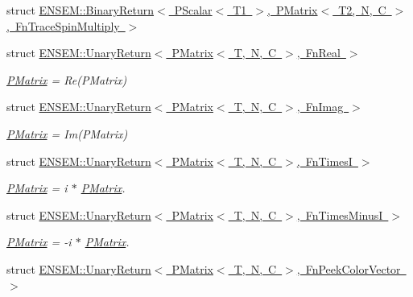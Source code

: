 \begin{DoxyCompactItemize}
\item 
struct \mbox{\hyperlink{structENSEM_1_1BinaryReturn_3_01PScalar_3_01T1_01_4_00_01PMatrix_3_01T2_00_01N_00_01C_01_4_00_01FnTraceSpinMultiply_01_4}{E\+N\+S\+E\+M\+::\+Binary\+Return$<$ P\+Scalar$<$ T1 $>$, P\+Matrix$<$ T2, N, C $>$, Fn\+Trace\+Spin\+Multiply $>$}}
\item 
struct \mbox{\hyperlink{structENSEM_1_1UnaryReturn_3_01PMatrix_3_01T_00_01N_00_01C_01_4_00_01FnReal_01_4}{E\+N\+S\+E\+M\+::\+Unary\+Return$<$ P\+Matrix$<$ T, N, C $>$, Fn\+Real $>$}}
\begin{DoxyCompactList}\small\item\em \mbox{\hyperlink{classENSEM_1_1PMatrix}{P\+Matrix}} = Re(\+P\+Matrix) \end{DoxyCompactList}\item 
struct \mbox{\hyperlink{structENSEM_1_1UnaryReturn_3_01PMatrix_3_01T_00_01N_00_01C_01_4_00_01FnImag_01_4}{E\+N\+S\+E\+M\+::\+Unary\+Return$<$ P\+Matrix$<$ T, N, C $>$, Fn\+Imag $>$}}
\begin{DoxyCompactList}\small\item\em \mbox{\hyperlink{classENSEM_1_1PMatrix}{P\+Matrix}} = Im(\+P\+Matrix) \end{DoxyCompactList}\item 
struct \mbox{\hyperlink{structENSEM_1_1UnaryReturn_3_01PMatrix_3_01T_00_01N_00_01C_01_4_00_01FnTimesI_01_4}{E\+N\+S\+E\+M\+::\+Unary\+Return$<$ P\+Matrix$<$ T, N, C $>$, Fn\+Times\+I $>$}}
\begin{DoxyCompactList}\small\item\em \mbox{\hyperlink{classENSEM_1_1PMatrix}{P\+Matrix}} = i $\ast$ \mbox{\hyperlink{classENSEM_1_1PMatrix}{P\+Matrix}}. \end{DoxyCompactList}\item 
struct \mbox{\hyperlink{structENSEM_1_1UnaryReturn_3_01PMatrix_3_01T_00_01N_00_01C_01_4_00_01FnTimesMinusI_01_4}{E\+N\+S\+E\+M\+::\+Unary\+Return$<$ P\+Matrix$<$ T, N, C $>$, Fn\+Times\+Minus\+I $>$}}
\begin{DoxyCompactList}\small\item\em \mbox{\hyperlink{classENSEM_1_1PMatrix}{P\+Matrix}} = -\/i $\ast$ \mbox{\hyperlink{classENSEM_1_1PMatrix}{P\+Matrix}}. \end{DoxyCompactList}\item 
struct \mbox{\hyperlink{structENSEM_1_1UnaryReturn_3_01PMatrix_3_01T_00_01N_00_01C_01_4_00_01FnPeekColorVector_01_4}{E\+N\+S\+E\+M\+::\+Unary\+Return$<$ P\+Matrix$<$ T, N, C $>$, Fn\+Peek\+Color\+Vector $>$}}

\end{DoxyCompactItemize}
